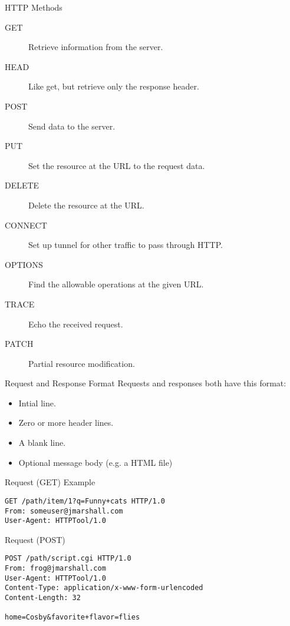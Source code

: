 \begin{frame}{HTTP Methods}
  \begin{description}
    \item[GET] Retrieve information from the server.
    \item[HEAD] Like get, but retrieve only the response header.
    \item[POST] Send data to the server.
    \item[PUT] Set the resource at the URL to the request data.
    \item[DELETE] Delete the resource at the URL.
    \item[CONNECT] Set up tunnel for other traffic to pass through HTTP.
    \item[OPTIONS] Find the allowable operations at the given URL.
    \item[TRACE] Echo the received request.
    \item[PATCH] Partial resource modification.
  \end{description}
\end{frame}


\begin{frame}[fragile]{Request and Response Format}
  Requests and responses both have this format:
  \begin{itemize}
    \item Intial line.
    \item Zero or more header lines.
    \item A blank line.
    \item Optional message body (e.g. a HTML file)
  \end{itemize}
\end{frame}


\begin{frame}[fragile]{Request (GET) Example}
  \begin{verbatim}
GET /path/item/1?q=Funny+cats HTTP/1.0
From: someuser@jmarshall.com
User-Agent: HTTPTool/1.0
  \end{verbatim}
\end{frame}


\begin{frame}[fragile]{Request (POST)}
  \begin{verbatim}
POST /path/script.cgi HTTP/1.0
From: frog@jmarshall.com
User-Agent: HTTPTool/1.0
Content-Type: application/x-www-form-urlencoded
Content-Length: 32

home=Cosby&favorite+flavor=flies
  \end{verbatim}
\end{frame}


